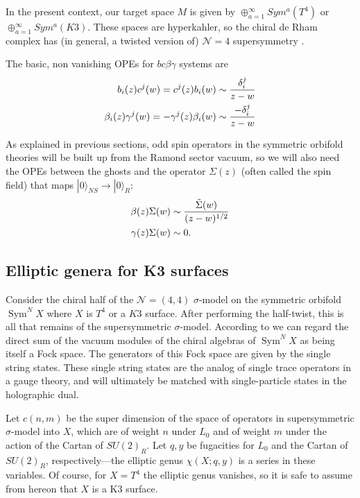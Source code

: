 \documentclass[11pt]{amsart}
\newcommand{\mc}{\mathcal}
\DeclareMathOperator{\Sym}{Sym} \DeclareMathOperator{\Hom}{Hom}
\theoremstyle{thm}
\numberwithin{equation}{subsection}
\theoremstyle{def}
\theoremstyle{rem}
\begin{document}
In the present context, our target space $M$ is given by $\oplus_{a=1}^{\infty} Sym^a (T^4)$ or $\oplus_{a=1}^{\infty} Sym^a(K3)$. These spaces are hyperkahler, so the chiral de Rham complex has  (in general, a twisted version of) $\mathcal{N}=4$ supersymmetry \cite{Heluanietal}.

The basic, non vanishing OPEs for $bc\beta\gamma$ systems are
\begin{align*}
b_i(z)c^j(w) = c^j(z)b_i(w) &\sim {\delta^{j}_i \over z - w} \\
\beta_i(z)\gamma^j(w) = -\gamma^j(z)\beta_i(w) &\sim {-\delta^{j}_i \over z - w}
\end{align*}

As explained in previous sections, odd spin operators in the symmetric orbifold theories will be built up from the Ramond sector vacuum, so we will also need the OPEs between the ghosts and the operator $\Sigma(z)$ (often called the spin field) that maps $|0\rangle_{NS} \rightarrow |0\rangle_{R}$:
\begin{align*}
\beta(z)\Sigma(w) &\sim {\tilde{\Sigma}(w) \over (z - w)^{1/2}}\\
\gamma(z)\Sigma(w) &\sim 0.
\end{align*}


\subsection{Elliptic genera for K3 surfaces}

Consider the chiral half of the $\mc N= (4,4)$ $\sigma$-model on the symmetric orbifold  $\Sym^N X$ where $X$ is $T^4$ or a $K3$ surface. 
After performing the half-twist, this is all that remains of the supersymmetric $\sigma$-model.
 According to \cite{DMVV} we can regard the direct sum of the vacuum modules of the chiral algebras of $\Sym^N X$ as being itself a Fock space. The generators of this Fock space are given by the single string states. These single string states are the analog of single trace operators in a gauge theory, and will ultimately be matched with single-particle states in the holographic dual.

Let $c(n,m)$ be the super dimension of the space of operators in supersymmetric $\sigma$-model into $X$, which are of weight $n$ under $L_0$ and of weight $m$ under the action of the Cartan of $SU(2)_R$.  
Let $q,y$ be fugacities for $L_0$ and the Cartan of $SU(2)_R$, respectively---the elliptic genus $\chi(X;q,y)$ is a series in these variables.  
Of course, for $X = T^4$ the elliptic genus vanishes, so it is safe to assume from hereon that $X$ is a K3 surface.
\end{document}
